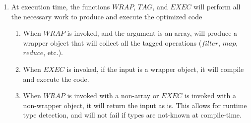 \documentclass{article}
\begin{document}
\begin{enumerate}
  \item At execution time, the functions $WRAP$, $TAG$, and $EXEC$ will perform all the necessary work to
  produce and execute the optimized code
    \begin{enumerate}
    \item When $WRAP$ is invoked, and the argument is an array, will produce a wrapper object that will collect 
      all the tagged operations ($filter$, $map$, $reduce$, etc.).  
    \item When $EXEC$ is invoked, if the input is a wrapper object, it will compile and execute the code.      
    \item When $WRAP$ is invoked with a non-array or $EXEC$ is invoked with a non-wrapper object, 
      it will return the input as is.  This allows for runtime type detection, and will not fail if 
      types are not-known at compile-time.  
    \end{enumerate}  
\end{enumerate}
\end{document}

